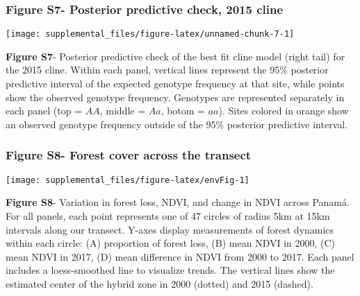 \documentclass[]{article}
\begin{document}
\subsubsection{Figure S7- Posterior predictive check, 2015
cline}\label{figure-s7--posterior-predictive-check-2015-cline}

\begin{center}\texttt{[image: supplemental\_files/figure-latex/unnamed-chunk-7-1]} \end{center}

\textbf{Figure S7}- Posterior predictive check of the best fit cline
model (right tail) for the 2015 cline. Within each panel, vertical lines
represent the 95\% posterior predictive interval of the expected
genotype frequency at that site, while points show the observed genotype
frequency. Genotypes are represented separately in each panel (top =
\(AA\), middle = \(Aa\), botom = \(aa\)). Sites colored in orange show
an observed genotype frequency outside of the 95\% posterior predictive
interval.

\pagebreak

\subsubsection{Figure S8- Forest cover across the
transect}\label{figure-s8--forest-cover-across-the-transect}

\begin{center}\texttt{[image: supplemental\_files/figure-latex/envFig-1]} \end{center}

\textbf{Figure S8}- Variation in forest loss, NDVI, and change in NDVI
across Panamá. For all panels, each point represents one of 47 circles
of radius 5km at 15km intervals along our transect. Y-axes display
measurements of forest dynamics within each circle: (A) proportion of
forest loss, (B) mean NDVI in 2000, (C) mean NDVI in 2017, (D) mean
difference in NDVI from 2000 to 2017. Each panel includes a
loess-smoothed line to visualize trends. The vertical lines show the
estimated center of the hybrid zone in 2000 (dotted) and 2015 (dashed).
\end{document}
